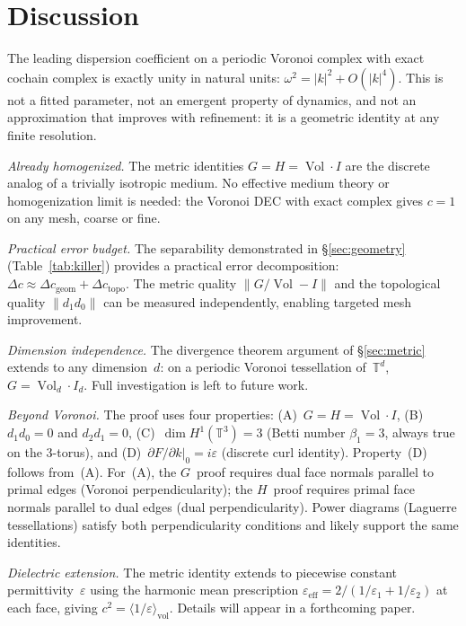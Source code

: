 \documentclass[preprint,12pt]{elsarticle}
\DeclareMathOperator{\Vol}{Vol}
\begin{document}
\section{Discussion}
\label{sec:discussion}

The leading dispersion coefficient on a periodic Voronoi complex with
exact cochain complex is exactly unity in natural units:
$\omega^2 = |k|^2 + O(|k|^4)$. This is not a fitted parameter, not an
emergent property of dynamics, and not an approximation that improves
with refinement: it is a geometric identity at any finite resolution.

\emph{Already homogenized.}
The metric identities $G = H = \Vol \cdot I$ are the discrete analog of a
trivially isotropic medium. No effective medium theory or homogenization
limit is needed: the Voronoi DEC with exact complex gives $c = 1$ on any
mesh, coarse or fine.

\emph{Practical error budget.}
The separability demonstrated in \S\ref{sec:geometry}
(Table~\ref{tab:killer}) provides a practical error decomposition:
$\Delta c \approx \Delta c_{\mathrm{geom}} + \Delta c_{\mathrm{topo}}$.
The metric quality $\|G/\Vol - I\|$ and the topological quality
$\|d_1 d_0\|$ can be measured independently, enabling targeted mesh
improvement.

\emph{Dimension independence.}
The divergence theorem argument of \S\ref{sec:metric} extends to any
dimension~$d$: on a periodic Voronoi tessellation of~$\mathbb{T}^d$,
$G = \Vol_d \cdot I_d$. Full investigation is left to future work.

\emph{Beyond Voronoi.}
The proof uses four properties: (A)~$G = H = \Vol \cdot I$,
(B)~$d_1 d_0 = 0$ and $d_2 d_1 = 0$, (C)~$\dim H^1(\mathbb{T}^3) = 3$
(Betti number $\beta_1 = 3$, always true on the 3-torus), and
(D)~$\partial F / \partial k|_0 = i\varepsilon$ (discrete curl identity).
Property~(D) follows from~(A). For~(A), the $G$~proof requires dual face
normals parallel to primal edges (Voronoi perpendicularity); the $H$~proof
requires primal face normals parallel to dual edges (dual perpendicularity).
Power diagrams (Laguerre tessellations) satisfy both perpendicularity
conditions and likely support the same identities.

\emph{Dielectric extension.}
The metric identity extends to piecewise constant permittivity~$\varepsilon$
using the harmonic mean prescription
$\varepsilon_{\mathrm{eff}} = 2/(1/\varepsilon_1 + 1/\varepsilon_2)$ at
each face, giving $c^2 = \langle 1/\varepsilon \rangle_{\mathrm{vol}}$.
Details will appear in a forthcoming paper.
\end{document}
